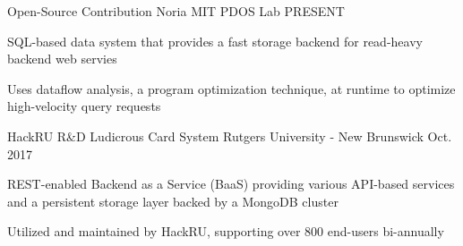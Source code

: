 
\begin{cventries}
  \cventry
  {Open-Source Contribution}
  {Noria}
  {MIT PDOS Lab}
  {PRESENT}
  {
    \begin{cvitems}
    \item {SQL-based data system that provides a fast storage backend for read-heavy backend web servies}
    \item {Uses dataflow analysis, a program optimization technique, at runtime to optimize high-velocity query requests}
    \end{cvitems}
  }

  \cventry
  {HackRU R\&D}
  {Ludicrous Card System}
  {Rutgers University - New Brunswick}
  {Oct. 2017}
  {
    \begin{cvitems}
    \item {REST-enabled Backend as a Service (BaaS) providing various API-based services and a persistent storage layer backed by a MongoDB cluster}
    \item {Utilized and maintained by HackRU, supporting over 800 end-users bi-annually}
    \end{cvitems}
  }
\end{cventries}
